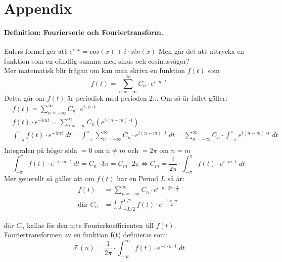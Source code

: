 \section*{Appendix}

\paragraph{Definition: Fourierserie och Fouriertransform. \\}
Eulers formel ger att $e^{i \cdot x} = cos(x) + i \cdot sin(x)$ Men går det att uttrycka en funktion som en oändlig summa
med sinus och cosinusvågor?\\
Mer matematisk blir frågan om kan man skriva en funktion $f(t)$ som 
\[
	f(t) = \sum_{n = - \infty}^\infty C_n \cdot e^{i \cdot n \cdot t}
\]
Detta går om $f(t)$ är periodisk med perioden $2 \pi$. Om så är fallet gäller:
\begin{align*}
	&f(t) = \sum_{n = - \infty}^\infty C_n \cdot e^{i \cdot n \cdot t} \\
	&f(t) \cdot e^{-imt} = \sum_{n = - \infty}^\infty C_n(e^{i(n - m) \cdot t}) \\
	&\int_{-\pi}^\pi f(t) \cdot e^{-imt}\; dt= \int_{-\pi}^\pi \sum_{n = - \infty}^\infty C_n \cdot e^{i(n - m) \cdot t}\; dt=
	\sum_{n = - \infty}^\infty C_n \cdot \int_{-\pi}^\pi e^{i (n - m) \cdot t}\; dt\\
\end{align*}
Integralen på höger sida $= 0 $ om $n \ne m$ och $= 2\pi $ om $n = m$
\[
	\int_{-\pi}^\pi f(t) \cdot e^{-i \cdot m \cdot t}\; dt 
		= C_n \cdot 3\pi = C_m \cdot 2\pi \Leftrightarrow C_m 
		= \frac 1 {2\pi} \cdot \int_{-\pi}^\pi f(t) \cdot e^{i \cdot m \cdot t}\; dt
\]
Mer generellt så gäller att om $f(t)$ har en Period $L$ så är:
\begin{align*}
	f(t) &= \sum_{n = - \infty}^\infty C_n \cdot e^{i \cdot n \cdot 2\pi \cdot \frac t L} \\ %
	\text{där } C_n &= \frac 1 L \int_{- L / 2}^{L / 2} f(t) \cdot e^{- \frac {i \cdot n \cdot 2\pi} {L}} 
\end{align*} %

där $C_n$ kallas för den n:te Fourierkoefficienten till $f(t)$. \\
Fouriertransformen av en funktion f(t) definieras som:
\[
	\mathcal{F}(u) = \frac 1 {2\pi} \cdot
	\int_{-\infty}^\infty f(t) \cdot e^{- i \cdot u \cdot t} \; dt
\]
